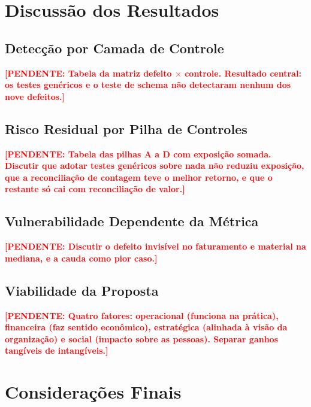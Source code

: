\documentclass[11pt,a4paper]{article}
\newcommand{\pend}[1]{\textcolor{red}{\textbf{[PENDENTE: #1]}}}
\begin{document}
\section{Discussão dos Resultados}

\subsection{Detecção por Camada de Controle}

\pend{Tabela da matriz defeito $\times$ controle. Resultado central: os
testes genéricos e o teste de schema não detectaram nenhum dos nove
defeitos.}

\subsection{Risco Residual por Pilha de Controles}

\pend{Tabela das pilhas A a D com exposição somada. Discutir que adotar
testes genéricos sobre nada não reduziu exposição, que a reconciliação de
contagem teve o melhor retorno, e que o restante só cai com reconciliação
de valor.}

\subsection{Vulnerabilidade Dependente da Métrica}

\pend{Discutir o defeito invisível no faturamento e material na mediana,
e a cauda como pior caso.}

\subsection{Viabilidade da Proposta}

\pend{Quatro fatores: operacional (funciona na prática), financeira (faz
sentido econômico), estratégica (alinhada à visão da organização) e
social (impacto sobre as pessoas). Separar ganhos tangíveis de
intangíveis.}

\section{Considerações Finais}
\end{document}
